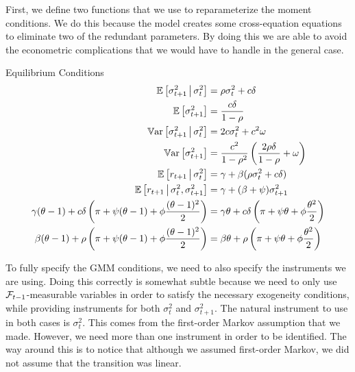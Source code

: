 \documentclass[11pt, letterpaper, twoside, final]{article}
\begin{document}
First, we define two functions that we use to reparameterize the moment conditions.
We do this because the model creates some cross-equation equations to eliminate two of the redundant parameters.
By doing this we are able to avoid the econometric complications that we would have to handle in the general
case.


\begin{defn}{Equilibrium Conditions}
    \begin{align}
        \operatorname{\mathbb{E}}\left[\sigma^2_{t+1} \,\middle\vert\, \sigma^2_t \right]  &= \rho \sigma^2_t  + c \delta\\
        \operatorname{\mathbb{E}}\left[\sigma^2_{t+1}\right]  &= \frac{c \delta}{1 - \rho} \\
        \operatorname{\mathbb{V}ar}\left[\sigma^2_{t+1} \,\middle\vert\, \sigma^2_t \right]  &=  2 c \sigma^2_t  + c^2 \omega \\
        \operatorname{\mathbb{V}ar}\left[\sigma^2_{t+1} \right]  &=  \frac{c^2}{1 - \rho^2}  \left(\frac{2 \rho \delta}{1 - \rho}  +
        \omega \right)  \\
        \label{eqn:market_risk_price}
        \operatorname{\mathbb{E}}\left[r_{t+1} \,\middle\vert\, \sigma^2_t\right] &= \gamma + \beta (\rho \sigma^2_t + c \delta)  \\
        \operatorname{\mathbb{E}}\left[r_{t+1} \,\middle\vert\, \sigma^2_t, \sigma^2_{t+1}\right] &= \gamma + (\beta + \psi) \sigma^2_{t+1}  \\
        \gamma (\theta - 1) + c \delta \left(\pi + \psi(\theta - 1) + \phi \frac{(\theta - 1)^2}{2}\right) &=
        \gamma \theta + c \delta \left(\pi + \psi \theta + \phi \frac{\theta^2}{2} \right) \\ 
        \beta (\theta - 1) + \rho \left(\pi + \psi (\theta-1)  + \phi \frac{(\theta -1)^2}{2}\right)
        &= \beta \theta + \rho \left(\pi + \psi \theta  + \phi \frac{\theta^2}{2}\right) 
    \end{align}
\end{defn}

To fully specify the GMM conditions, we need to also specify the instruments we are using.
Doing this correctly is somewhat subtle because we need to only use $\mathcal{F}_{t-1}$-measurable variables in order to
satisfy the necessary exogeneity conditions, while providing instruments for both $\sigma^2_t$ and
$\sigma^2_{t+1}$. 
The natural instrument to use in both cases is $\sigma^2_t$.
This comes from the first-order Markov assumption that we made.
However, we need more than one instrument in order to be identified.
The way around this is to notice that although we assumed first-order Markov, we did not assume that the
transition was linear. 
\end{document}
